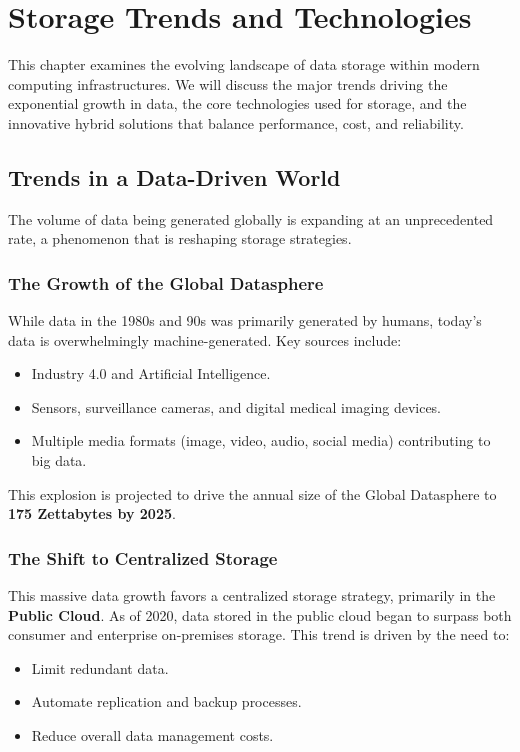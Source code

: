 \chapter{Storage Trends and Technologies}

This chapter examines the evolving landscape of data storage within modern computing infrastructures. We will discuss the major trends driving the exponential growth in data, the core technologies used for storage, and the innovative hybrid solutions that balance performance, cost, and reliability.

\section{Trends in a Data-Driven World}
The volume of data being generated globally is expanding at an unprecedented rate, a phenomenon that is reshaping storage strategies.

\subsection{The Growth of the Global Datasphere}
While data in the 1980s and 90s was primarily generated by humans, today's data is overwhelmingly machine-generated. Key sources include:
\begin{itemize}
    \item Industry 4.0 and Artificial Intelligence.
    \item Sensors, surveillance cameras, and digital medical imaging devices.
    \item Multiple media formats (image, video, audio, social media) contributing to big data.
\end{itemize}
This explosion is projected to drive the annual size of the Global Datasphere to \textbf{175 Zettabytes by 2025}.

\subsection{The Shift to Centralized Storage}
This massive data growth favors a centralized storage strategy, primarily in the \textbf{Public Cloud}. As of 2020, data stored in the public cloud began to surpass both consumer and enterprise on-premises storage. This trend is driven by the need to:
\begin{itemize}
    \item Limit redundant data.
    \item Automate replication and backup processes.
    \item Reduce overall data management costs.
\end{itemize}

